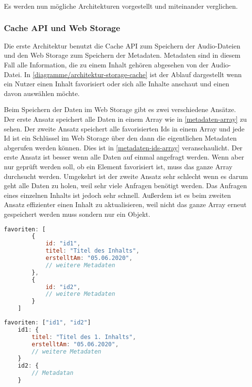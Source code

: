 Es werden nun mögliche Architekturen vorgestellt und miteinander verglichen. 

\subsubsection{Cache API und Web Storage}
Die erste Architektur benutzt die Cache \ac{API} zum Speichern der Audio-Dateien und den Web Storage zum Speichern der Metadaten. Metadaten sind in diesem Fall alle Information, die zu einem Inhalt gehören abgesehen von der Audio-Datei. In \autoref{diagramme/architektur-storage-cache} ist der Ablauf dargestellt wenn ein Nutzer einen Inhalt favorisiert oder sich alle Inhalte anschaut und einen davon auswählen möchte. 


Beim Speichern der Daten im Web Storage gibt es zwei verschiedene Ansätze. Der erste Ansatz speichert alle Daten in einem Array wie in \autoref{metadaten-array} zu sehen. Der zweite Ansatz speichert alle favorisierten Ids in einem Array und jede Id ist ein Schlüssel im Web Storage über den dann die eigentlichen Metadaten abgerufen werden können. Dies ist in \autoref{metadaten-ids-array} veranschaulicht.
Der erste Ansatz ist besser wenn alle Daten auf einmal angefragt werden. Wenn aber nur geprüft werden soll, ob ein Element favorisiert ist, muss das ganze Array durchsucht werden. Umgekehrt ist der zweite Ansatz sehr schlecht wenn es darum geht alle Daten zu holen, weil sehr viele Anfragen benötigt werden. Das Anfragen eines einzelnen Inhalts ist jedoch sehr schnell. Außerdem ist es beim zweiten Ansatz effizienter einen Inhalt zu aktualisieren, weil nicht das ganze Array erneut gespeichert werden muss sondern nur ein Objekt.

\clearpage

\begin{lstlisting}[language=JavaScript,caption={Speichern der Metadaten in einem Array},label={metadaten-array}]
    favoriten: [
    	{
    		id: "id1",
    		titel: "Titel des Inhalts",
    		erstelltAm: "05.06.2020",
    		// weitere Metadaten
    	},
    	{
    		id: "id2",
    		// weitere Metadaten
    	}
    ]
\end{lstlisting}

\begin{lstlisting}[language=JavaScript,caption={Speichern der Ids in einem Array},label={metadaten-ids-array}]
    favoriten: ["id1", "id2"]
    id1: {
    	titel: "Titel des 1. Inhalts",
    	erstelltAm: "05.06.2020",
    	// weitere Metadaten
    }
    id2: { 
    	// Metadatan
    }
\end{lstlisting}

